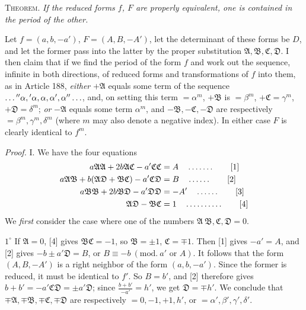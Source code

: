 \textsc{Theorem.} \textit{If the reduced forms $f$, $F$ are properly equivalent, one is contained in the period of the other.}

Let $f=(a,b,-a')$, $F=(A,B,-A')$, let the determinant of these forms be $D$, and let the former pass into the latter by the proper substitution $\mathfrak{A},\mathfrak{B},\mathfrak{C},\mathfrak{D}$. I then claim that if we find the period of the form $f$ and work out the sequence, infinite in both directions, of reduced forms and transformations of $f$ into them, as in Article 188, \textit{either} $+\mathfrak{A}$ equals some term of the sequence $\mathinner{\ldotp\ldotp\ldotp}{}''\alpha,{}'\alpha,\alpha,\alpha',\alpha''\mathinner{\ldotp\ldotp\ldotp}$, and, on setting this term $=\alpha^m$, $+\mathfrak{B}$ is $=\beta^m$, $+\mathfrak{C}=\gamma^m$, $+\mathfrak{D}=\delta^m$; \textit{or} $-\mathfrak{A}$ equals some term $\alpha^m$, and $-\mathfrak{B},-\mathfrak{C},-\mathfrak{D}$ are respectively $=\beta^m,\gamma^m,\delta^m$ (where $m$ may also denote a negative index). In either case $F$ is clearly identical to $f^m$.

\textit{Proof.} I. We have the four equations
\begin{align*}
a\mathfrak{A}\mathfrak{A}+2b\mathfrak{A}\mathfrak{C}-a'\mathfrak{C}\mathfrak{C}&=A \quad \mathinner{\ldotp\ldotp\ldotp\ldotp\ldotp\ldotp\ldotp} \tag*{[1]}\\
a\mathfrak{A}\mathfrak{B}+b(\mathfrak{A}\mathfrak{D}+\mathfrak{B}\mathfrak{C})-a'\mathfrak{C}\mathfrak{D}&=B \quad \mathinner{\ldotp\ldotp\ldotp\ldotp\ldotp\ldotp} \tag*{[2]}\\
a\mathfrak{B}\mathfrak{B}+2b\mathfrak{B}\mathfrak{D}-a'\mathfrak{D}\mathfrak{D}&=-A' \quad \mathinner{\ldotp\ldotp\ldotp\ldotp\ldotp\ldotp} \tag*{[3]}\\
\mathfrak{A}\mathfrak{D}-\mathfrak{B}\mathfrak{C}&=1 \quad \mathinner{\ldotp\ldotp\ldotp\ldotp\ldotp\ldotp\ldotp\ldotp\ldotp\ldotp} \tag*{[4]}
\end{align*}
We \textit{first} consider the case where one of the numbers $\mathfrak{A}\ \mathfrak{B},\mathfrak{C},\mathfrak{D}=0$.

$1^\circ$ If $\mathfrak{A}=0$, [4] gives $\mathfrak{B}\mathfrak{C}=-1$, so $\mathfrak{B}=\pm1$, $\mathfrak{C}=\mp1$. Then [1] gives $-a'=A$, and [2] gives $-b\pm a'\mathfrak{D}=B$, or $B\equiv-b\ (\mathrm{mod.}\ a'\text{ or }A)$. It follows that the form $(A,B,-A')$ is a right neighbor of the form $(a,b,-a')$. Since the former is reduced, it must be identical to $f'$. So $B=b'$, and [2] therefore gives $b+b'=-a'\mathfrak{C}\mathfrak{D}=\pm a'\mathfrak{D}$; since $\frac{b+b'}{-a'}=h'$, we get $\mathfrak{D}=\mp h'$. We conclude that $\mp\mathfrak{A},\mp\mathfrak{B},\mp\mathfrak{C},\mp\mathfrak{D}$ are respectively $=0,-1,+1,h'$, or $=\alpha',\beta',\gamma',\delta'$.


